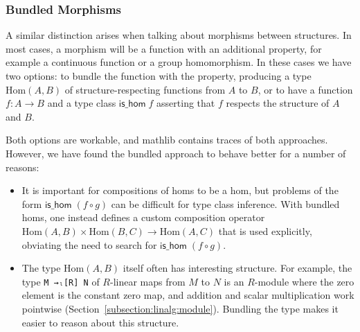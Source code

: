\documentclass[sigplan]{acmart}\settopmatter{}
\newcommand{\mathlib}{\textsf{mathlib}\xspace}
\begin{document}
\subsubsection{Bundled Morphisms}

A similar distinction arises when talking about morphisms between structures.
In most cases, a morphism will be a function with an additional property, for example a continuous function or a group homomorphism.
In these cases we have two options: to bundle the function with the property, producing a type $\mathrm{Hom}(A,B)$ of structure-respecting functions from $A$ to $B$, or to have a function $f:A\to B$ and a type class $\mathsf{is\_hom}\;f$ asserting that $f$ respects the structure of $A$ and $B$.

Both options are workable, and \mathlib contains traces of both approaches.
However, we have found the bundled approach to behave better for a number of reasons:

\begin{itemize}
\item It is important for compositions of homs to be a hom,
but problems of the form $\mathsf{is\_hom}\;(f\circ g)$ can be difficult for type class inference.
With bundled homs, one instead defines a custom composition operator $\mathrm{Hom}(A,B)\times \mathrm{Hom}(B,C)\to \mathrm{Hom}(A,C)$ that is used explicitly, obviating the need to search for $\mathsf{is\_hom}\;(f\circ g)$.
\item The type $\mathrm{Hom}(A,B)$ itself often has interesting structure.
For example, the type \lstinline{M →ₗ[R] N} of $R$-linear maps from $M$ to $N$ is an $R$-module where the zero element is the constant zero map, and addition and scalar multiplication work pointwise (Section~\ref{subsection:linalg:module}).
Bundling the type makes it easier to reason about this structure.
\end{itemize}
\end{document}
